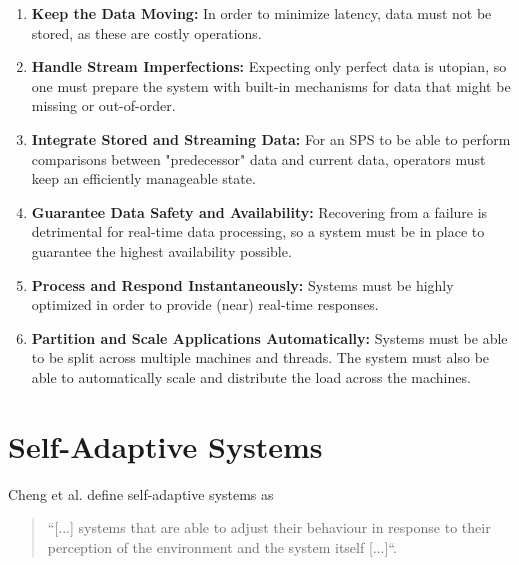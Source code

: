         \begin{enumerate}
        \label{enum:requirements}
            \item \textbf{Keep the Data Moving:} 
                In order to minimize latency, data must not be stored, as these are costly operations.
            \item \textbf{Handle Stream Imperfections:} 
                Expecting only perfect data is utopian, so one must prepare the system with built-in mechanisms for data that might be missing or out-of-order.
            \item \textbf{Integrate Stored and Streaming Data:} 
                For an SPS to be able to perform comparisons between "predecessor" data and current data, operators must keep an efficiently manageable state.
            \item \textbf{Guarantee Data Safety and Availability:} 
                Recovering from a failure is detrimental for real-time data processing, so a system must be in place to guarantee the highest availability possible.
            \item \textbf{Process and Respond Instantaneously:} 
                Systems must be highly optimized in order to provide (near) real-time responses.
            \item \textbf{Partition and Scale Applications Automatically:} 
                Systems must be able to be split across multiple machines and threads.
                The system must also be able to automatically scale and distribute the load across the machines.

        \end{enumerate}

    \section{Self-Adaptive Systems}
    \label{sec:self-adaptive}
    
    Cheng et al. define self-adaptive systems as
    \begin{quotation}
        ``[...] systems that are able to adjust their behaviour in response to their perception of the environment and the
        system itself [...]``\cite[p.1]{Cheng:2009:SES:1573856.1573858}.
    \end{quotation}
    
